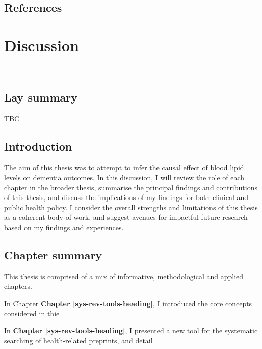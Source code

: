 \documentclass[a4paper, twoside]{templates/ociamthesis}
\begin{document}
\newpage

\hypertarget{references-6}{%
\section{References}\label{references-6}}



\hypertarget{discussion-heading}{%
\chapter{Discussion}\label{discussion-heading}}

\minitoc 

~

\hypertarget{lay-summary-7}{%
\section{Lay summary}\label{lay-summary-7}}

TBC

\hypertarget{introduction-4}{%
\section{Introduction}\label{introduction-4}}

The aim of this thesis was to attempt to infer the causal effect of blood lipid levels on dementia outcomes. In this discussion, I will review the role of each chapter in the broader thesis, summarise the principal findings and contributions of this thesis, and discuss the implications of my findings for both clinical and public health policy. I consider the overall strengths and limitations of this thesis as a coherent body of work, and suggest avenues for impactful future research based on my findings and experiences.

\hypertarget{chapter-summary}{%
\section{Chapter summary}\label{chapter-summary}}

This thesis is comprised of a mix of informative, methodological and applied chapters.

In Chapter \textbf{Chapter \ref{sys-rev-tools-heading}}, I introduced the core concepts considered in thie

In \textbf{Chapter \ref{sys-rev-tools-heading}}, I presented a new tool for the systematic searching of health-related preprints, and detail
\end{document}

